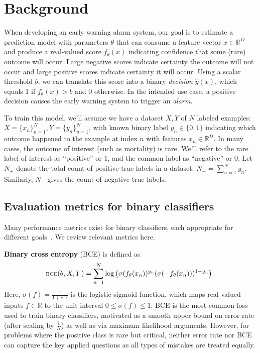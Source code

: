 \section{Background}
When developing an early warning alarm system, our goal is to estimate a prediction model with parameters $\theta$ that can consume a feature vector $x \in \mathbb{R}^D$ and produce a real-valued score $f_{\theta}(x)$ indicating confidence that some (rare) outcome will occur. 
Large negative scores indicate certainty the outcome will not occur and large positive scores indicate certainty it will occur.
Using a scalar threshold $b$, we can translate this score into a binary \emph{decision} $\hat{y}(x)$, which equals 1 if $f_{\theta}(x) > b$ and 0 otherwise. 
In the intended use case, a positive decision causes the early warning system to trigger an \emph{alarm}.

To train this model, we'll assume we have a dataset $X,Y$ of $N$ labeled examples: $X = \{x_n\}_{n=1}^N, Y = \{y_n\}_{n=1}^N$, with known binary label $y_n \in \{0, 1\}$ indicating which outcome happened to the example at index $n$ with features $x_n \in \mathbb{R}^D$. 
In many cases, the outcome of interest (such as mortality) is rare. 
We'll refer to the rare label of interest as ``positive'' or 1, and the common label as ``negative'' or 0.
Let $N_+$ denote the total count of positive true labels in a dataset: $N_+ = \sum_{n=1}^N y_n$. Similarly, $N_-$ gives the count of negative true labels.

\subsection{Evaluation metrics for binary classifiers}
Many performance metrics exist for binary classifiers, each  appropriate for different goals~\citep{romero-brufauWhyCstatisticNot2015}. We review relevant metrics here.

\textbf{Binary cross entropy} (BCE) is defined as
\begin{align}
{\scriptsize  
\text{BCE}(\theta, X, Y)} = \sum_{n=1}^N \log
	\left(
	\sigma( f_{\theta}(x_n) )^{y_n}
	(\sigma(-f_{\theta}( x_n)) )^{1-y_n}
	\right).
	\notag
\end{align}
Here, $\sigma(f) = \frac{1}{1+e^{-f}}$ is the logistic sigmoid function, which maps real-valued inputs $f\in\mathbb{R}$ to the unit interval $0 \leq \sigma(f) \leq 1$.
BCE is the most common loss used to train binary classifiers, motivated as a smooth upper bound on error rate (after scaling by $\frac{1}{N}$) as well as via maximum likelihood arguments. However, for problems where the positive class is rare but critical, neither error rate nor BCE can capture the key applied questions as all types of mistakes are treated equally.

